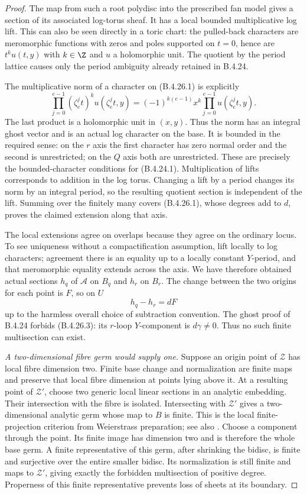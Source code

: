 \begin{proof}
The map from such a root polydisc into the
prescribed fan model gives a section of its
associated log-torus sheaf. It has a local bounded
multiplicative log lift. This can also be seen
directly in a toric chart: the pulled-back characters
are meromorphic functions with zeros and poles
supported on $t=0$, hence are $t^k u(t,y)$ with
$k\in\Z$ and $u$ a holomorphic unit. The quotient
by the period lattice causes only the period
ambiguity already retained in B.4.24.

The multiplicative norm of a character on (B.4.26.1)
is explicitly
\[
 \prod_{j=0}^{e-1}(\zeta_e^j t)^k
              u(\zeta_e^j t,y)
 =(-1)^{k(e-1)}x^k
              \prod_{j=0}^{e-1}u(\zeta_e^j t,y).
 \tag{B.4.26.2}
\]
The last product is a holomorphic unit in $(x,y)$.
Thus the norm has an integral ghost vector and
is an actual log character on the base. It is
bounded in the required sense: on the $r$ axis
the first character has zero normal order and
the second is unrestricted; on the $Q$ axis
both are unrestricted. These are precisely the
bounded-character conditions for (B.4.24.1).
Multiplication of lifts corresponds to addition
in the log torus. Changing a lift by a period
changes its norm by an integral period, so the
resulting quotient section is independent of
the lift. Summing over the finitely many covers
(B.4.26.1), whose degrees add to $d$, proves the
claimed extension along that axis.

The local extensions agree on overlaps because
they agree on the ordinary locus. To see uniqueness
without a compactification assumption, lift locally
to log characters; agreement there is an equality
up to a locally constant $Y$-period, and that
meromorphic equality extends across the axis.
We have therefore obtained actual sections
$h_q$ of $\mathcal A$ on $B_q$ and $h_r$ on
$B_r$. The change between the two origins for
each point is $F$, so on $U$
\[
 h_q-h_r=dF
 \tag{B.4.26.3}
\]
up to the harmless overall choice of subtraction
convention. The ghost proof of B.4.24 forbids
(B.4.26.3): its $r$-loop $Y$-component is
$d\gamma\ne0$. Thus no such finite multisection
can exist.

\emph{A two-dimensional fibre germ would supply one.}
Suppose an origin point of $\mathcal Z$ has local
fibre dimension two. Finite base change and
normalization are finite maps and preserve that
local fibre dimension at points lying above it.
At a resulting point of $\mathcal Z'$, choose
two generic local linear sections in an analytic
embedding. Their intersection with the fibre is
isolated. Intersecting with $\mathcal Z'$ gives
a two-dimensional analytic germ whose map to
$B$ is finite. This is the local finite-projection
criterion from Weierstrass preparation; see also
\citet[Chapter II, Sections 7--8]{Demailly2012E}.
Choose a component through the point. Its finite
image has dimension two and is therefore the
whole base germ. A finite representative of this
germ, after shrinking the bidisc, is finite and
surjective over the entire smaller bidisc. Its
normalization is still finite and maps to
$\mathcal Z'$, giving exactly the forbidden
multisection of positive degree. Properness of
this finite representative prevents loss of
sheets at its boundary.


\end{proof}
